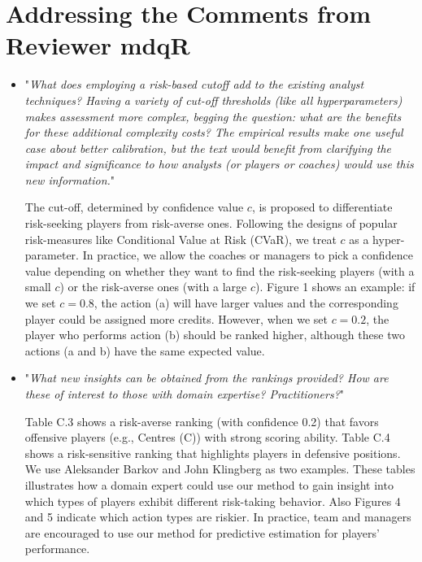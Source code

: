 \documentclass[letterpaper]{article} %
\begin{document}
\section{Addressing the Comments from Reviewer mdqR}

\begin{itemize}
    \item "{\it What does employing a risk-based cutoff add to the existing analyst techniques? Having a variety of cut-off thresholds (like all hyperparameters) makes assessment more complex, begging the question: what are the benefits for these additional complexity costs? The empirical results make one useful case about better calibration, but the text would benefit from clarifying the impact and significance to how analysts (or players or coaches) would use this new information.}"
    
    The cut-off, determined by confidence value $c$, is proposed to differentiate risk-seeking players from risk-averse ones. Following the designs of popular risk-measures like Conditional Value at Risk (CVaR), we treat $c$ as a hyper-parameter.  In practice, we allow the coaches or managers to pick a confidence value depending on whether they want to find the risk-seeking players (with a small $c$) or the risk-averse ones (with a large $c$). Figure 1 shows an example: if we set $c=0.8$, the action (a) will have larger values and the corresponding player could be assigned more credits. However, when we set $c=0.2$, the player who performs action (b) should be ranked higher, although these two actions (a and b) have the same expected value.
    \medskip
    
    \item "{\it What new insights can be obtained from the rankings provided? How are these of interest to those with domain expertise? Practitioners?}"
    
    Table C.3 shows a risk-averse ranking (with confidence 0.2) that favors offensive players (e.g., Centres (C)) with strong scoring ability. Table C.4 shows a risk-sensitive ranking that highlights players in defensive positions. We use Aleksander Barkov and John Klingberg as two examples. These tables illustrates how a domain expert could use our method to gain insight into which types of players exhibit different risk-taking behavior. Also Figures 4 and 5 indicate which action types are riskier. In practice, team and managers are encouraged to use our method for predictive estimation for players' performance.   
    \medskip
    

\end{itemize}
\end{document}
